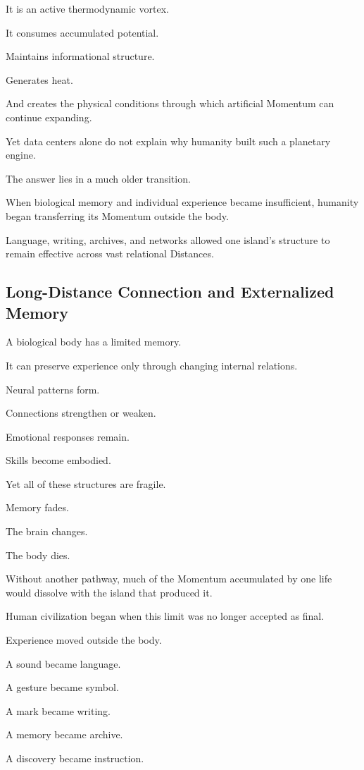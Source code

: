 It is an active thermodynamic vortex.

It consumes accumulated potential.

Maintains informational structure.

Generates heat.

And creates the physical conditions through which artificial Momentum can continue expanding.

Yet data centers alone do not explain why humanity built such a planetary engine.

The answer lies in a much older transition.

When biological memory and individual experience became insufficient, humanity began transferring its Momentum outside the body.

Language, writing, archives, and networks allowed one island’s structure to remain effective across vast relational Distances.

\subsection*{\textbf{Long-Distance Connection and Externalized Memory}} 

A biological body has a limited memory.

It can preserve experience only through changing internal relations.

Neural patterns form.

Connections strengthen or weaken.

Emotional responses remain.

Skills become embodied.

Yet all of these structures are fragile.

Memory fades.

The brain changes.

The body dies.

Without another pathway, much of the Momentum accumulated by one life would dissolve with the island that produced it.

Human civilization began when this limit was no longer accepted as final.

Experience moved outside the body.

A sound became language.

A gesture became symbol.

A mark became writing.

A memory became archive.

A discovery became instruction.

